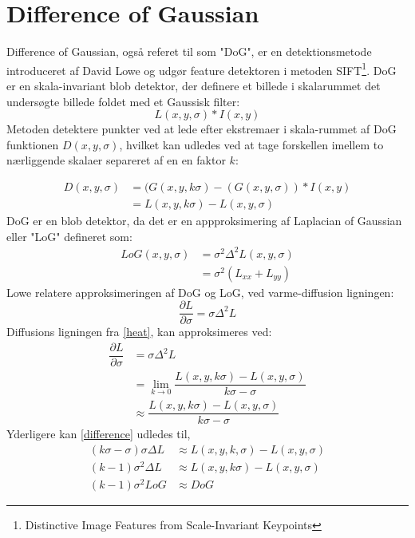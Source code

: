 \section{Difference of Gaussian}
Difference of Gaussian, også referet til som "DoG", er en detektionsmetode introduceret  af David Lowe \cite{sift} og udgør feature detektoren i metoden SIFT\footnote{Distinctive Image Features
from Scale-Invariant Keypoints}. DoG er en skala-invariant blob detektor, der definere et billede i skalarummet det undersøgte billede foldet med et Gaussisk filter:
\begin{equation}
L(x,y,\sigma) \ast I(x,y)
\end{equation}
Metoden detektere punkter ved at lede efter ekstremaer i skala-rummet af DoG funktionen $ D(x,y,\sigma) $, hvilket kan udledes ved at tage forskellen imellem to nærliggende skalaer separeret af en en faktor $k$:

\begin{equation}
\begin{split}
D(x,y,\sigma) &= (G(x,y,k\sigma)-(G(x,y,\sigma))\ast I(x,y) \\
           &= L(x,y,k \sigma)-L(x,y,\sigma)
\end{split}
\end{equation}
DoG er en blob detektor, da det er en appproksimering af Laplacian of Gaussian eller "LoG" defineret som:
\begin{equation}
\begin{split}
LoG(x,y,\sigma) &= \sigma^2 \Delta^2L(x,y,\sigma) \\
                &= \sigma^2 (L_{xx}+L_{yy})
\end{split}
\end{equation}
Lowe relatere approksimeringen af DoG og LoG, ved varme-diffusion ligningen:
\begin{equation}
\dfrac{\partial L}{\partial \sigma} = \sigma \Delta^2L
\label{heat}
\end{equation}
Diffusions ligningen fra \eqref{heat}, kan approksimeres ved:
\begin{equation}
\begin{split}
\dfrac{\partial L}{\partial \sigma} &= \sigma \Delta^2L \\
&= \lim_{k \to 0} \dfrac{L(x,y,k\sigma)-L(x,y,\sigma)}{k\sigma-\sigma} \\
&\approx \dfrac{L(x,y,k\sigma)-L(x,y,\sigma)}{k\sigma-\sigma}
\end{split}
\label{difference}
\end{equation}
Yderligere kan \eqref{difference} udledes til,
\begin{equation}
\begin{split}
(k\sigma-\sigma)\sigma\Delta L &\approx L(x,y,k,\sigma)-L(x,y,\sigma) \\
(k-1)\sigma^2\Delta L &\approx L(x,y,k\sigma)-L(x,y,\sigma) \\
(k-1)\sigma^2LoG &\approx DoG
\end{split}
\end{equation}

